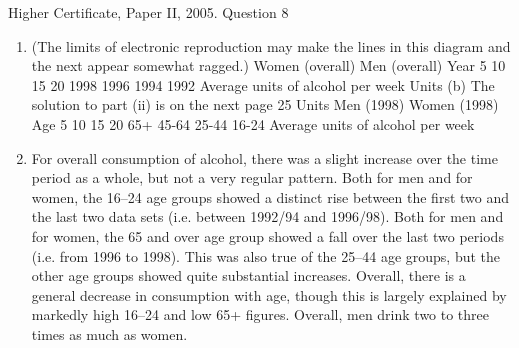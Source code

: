 \documentclass[a4paper,12pt]{article}
\begin{document}
Higher Certificate, Paper II, 2005. Question 8
\begin{enumerate}

\item 
(The limits of electronic reproduction may make the lines in this diagram and the next appear somewhat ragged.)
Women (overall)
Men (overall)
Year
5
10
15
20
1998
1996
1994
1992
Average units of alcohol per week
Units
(b)
The solution to part (ii) is on the next page
25
Units
Men (1998)
Women (1998)
Age
5
10
15
20
65+
45-64
25-44
16-24
Average units of alcohol per week
\item 
For overall consumption of alcohol, there was a slight increase over the time period as a whole, but not a very regular pattern.
Both for men and for women, the 16–24 age groups showed a distinct rise between the first two and the last two data sets (i.e. between 1992/94 and 1996/98).
Both for men and for women, the 65 and over age group showed a fall over the last two periods (i.e. from 1996 to 1998). This was also true of the 25–44 age groups, but the other age groups showed quite substantial increases.
Overall, there is a general decrease in consumption with age, though this is largely explained by markedly high 16–24 and low 65+ figures.
Overall, men drink two to three times as much as women.
\end{enumerate}
\end{document}
